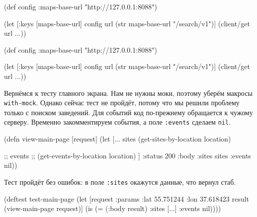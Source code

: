 \begin{english}
  \begin{clojure}
(def config
  {:maps-base-url
     "http://127.0.0.1:8088"})

(let [{:keys [maps-base-url]} config
      url (str maps-base-url
               "/search/v1")]
  (client/get url {...}))
  \end{clojure}
\end{english}

\else

\begin{english}
  \begin{clojure}
(def config
  {:maps-base-url "http://127.0.0.1:8088"})

(let [{:keys [maps-base-url]} config
      url (str maps-base-url "/search/v1")]
  (client/get url {...}))
  \end{clojure}
\end{english}

\fi

Вернёмся к тесту главного экрана. Нам не нужны моки, поэтому уберём макросы
\verb|with-mock|. Однако сейчас тест не пройдёт, потому что мы решили проблему
только с поиском заведений. Для событий код по-прежнему обращается к чужому
серверу. Временно закомментируем события, а поле \verb|:events| сделаем
\verb|nil|.

\begin{english}
  \begin{clojure}
(defn view-main-page [request]
  (let [...
        sites
        (get-sites-by-location location)

        ;; events
        ;; (get-events-by-location location)
       ]
    {:status 200
     :body {:sites sites :events nil}}))
  \end{clojure}
\end{english}

Тест пройдёт без ошибок: в поле \verb|:sites| окажутся данные, что вернул стаб.

\ifnarrow

\begin{english}
  \begin{clojure}
(deftest test-main-page
  (let [request
        {:params {:lat 55.751244
                  :lon 37.618423}}
        result (view-main-page request)]
    (is (= (:body result)
           {:sites [...] :events nil}))))
  \end{clojure}
\end{english}

\else

